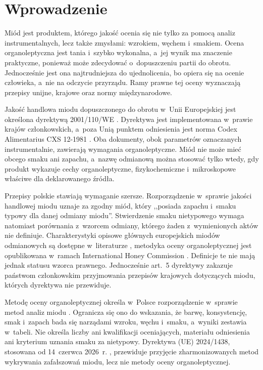 \section{Wprowadzenie}

Miód jest produktem, którego jakość ocenia się nie tylko za pomocą analiz
instrumentalnych, lecz także zmysłami: wzrokiem, węchem i~smakiem. Ocena
organoleptyczna jest tania i~szybko wykonalna, a~jej wynik ma znaczenie
praktyczne, ponieważ może zdecydować o~dopuszczeniu partii do obrotu.
Jednocześnie jest ona najtrudniejsza do ujednolicenia, bo opiera się na
ocenie człowieka, a~nie na odczycie przyrządu. Ramy prawne tej oceny
wyznaczają przepisy unijne, krajowe oraz normy międzynarodowe.

Jakość handlowa miodu dopuszczonego do obrotu w~Unii Europejskiej jest
określona dyrektywą 2001/110/WE \cite{Dyrektywa2001110}. Dyrektywa jest
implementowana w~prawie krajów członkowskich, a~poza Unią punktem odniesienia
jest norma Codex Alimentarius CXS 12-1981 \cite{CodexHoney}. Oba dokumenty,
obok parametrów oznaczanych instrumentalnie, zawierają wymagania
organoleptyczne. Miód nie może mieć obcego smaku ani zapachu, a~nazwę
odmianową można stosować tylko wtedy, gdy produkt wykazuje cechy
organoleptyczne, fizykochemiczne i~mikroskopowe właściwe dla deklarowanego
źródła.

Przepisy polskie stawiają wymaganie szersze. Rozporządzenie w~sprawie
jakości handlowej miodu \cite{RozporzadzenieMRiRW2003} uznaje za zgodny miód, który ,,posiada zapachu i~smaku typowy dla danej odmiany miodu''.
Stwierdzenie smaku nietypowego wymaga natomiast porównania z~wzorcem odmiany, którego żaden z~wymienionych aktów nie definiuje. Charakterystyki opisowe głównych europejskich miodów
odmianowych są dostępne w~literaturze \cite{PersanoOddo2004}, metodyka oceny organoleptycznej jest opublikowana w~ramach International Honey Commission \cite{Piana2004}.  Definicje te nie mają jednak statusu wzorca prawnego. Jednocześnie art.~5 dyrektywy\cite{Dyrektywa2001110} zakazuje państwom członkowskim przyjmowania przepisów krajowych dotyczących miodu, których dyrektywa nie przewiduje.

Metodę oceny organoleptycznej określa w~Polsce rozporządzenie w~sprawie metod
analiz miodu \cite{RozporzadzenieMRiRW2009}. Ogranicza się ono do wskazania,
że barwę, konsystencję, smak i~zapach bada się narządami wzroku, węchu
i~smaku, a~wyniki zestawia w~tabeli. Nie określa liczby ani kwalifikacji
oceniających, materiału odniesienia ani kryterium uznania smaku za
nietypowy. Dyrektywa (UE) 2024/1438, stosowana od 14~czerwca 2026~r.
\cite{Dyrektywa20241438}, przewiduje przyjęcie zharmonizowanych metod
wykrywania zafałszowań miodu, lecz nie metody oceny organoleptycznej.


